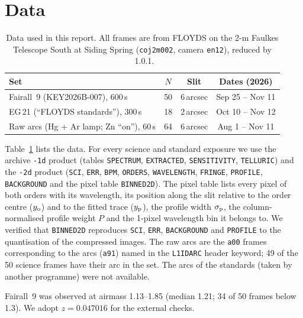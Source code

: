 \section{Data}
\label{sec:data}

\begin{table}
\centering
\caption{Data used in this report. All frames are from FLOYDS on the 2-m Faulkes Telescope South at Siding Spring
(\texttt{coj2m002}, camera \texttt{en12}), reduced by \banzai{}~1.0.1.}
\label{tab:data}
\begin{tabular}{lccc}
\toprule
Set & $N$ & Slit & Dates (2026) \\
\midrule
Fairall~9 (KEY2026B-007), 600\,s & 50 & 6\,arcsec & Sep 25 -- Nov 11 \\
EG\,21 (``FLOYDS standards''), 300\,s & 18 & 2\,arcsec & Oct 10 -- Nov 12 \\
Raw arcs (Hg + Ar lamp; Zn ``on''), 60\,s & 64 & 6\,arcsec & Aug 1 -- Nov 11 \\
\bottomrule
\end{tabular}
\end{table}

Table~\ref{tab:data} lists the data. For every science and standard exposure we use the archive \texttt{-1d}
product (tables \texttt{SPECTRUM}, \texttt{EXTRACTED}, \texttt{SENSITIVITY}, \texttt{TELLURIC}) and the
\texttt{-2d} product (\texttt{SCI}, \texttt{ERR}, \texttt{BPM}, \texttt{ORDERS}, \texttt{WAVELENGTH},
\texttt{FRINGE}, \texttt{PROFILE}, \texttt{BACKGROUND} and the pixel table \texttt{BINNED2D}). The pixel table lists
every pixel of both orders with its wavelength, its position along the slit relative to the order centre
($y_{\rm o}$) and to the fitted trace ($y_{\rm p}$), the profile width $\sigma_{\rm p}$, the column-normalised
profile weight $P$ and the 1-pixel wavelength bin it belongs to. We verified that \texttt{BINNED2D} reproduces
\texttt{SCI}, \texttt{ERR}, \texttt{BACKGROUND} and \texttt{PROFILE} to the quantisation of the compressed images.
The raw arcs are the \texttt{a00} frames corresponding to the arcs (\texttt{a91}) named in the \texttt{L1IDARC} header
keyword; 49 of the 50 science frames have their arc in the set. The arcs of the standards (taken by another
programme) were not available.

Fairall~9 was observed at airmass 1.13--1.85 (median 1.21; 34 of 50 frames below 1.3). We adopt
$z=0.047016$ for the external checks.
